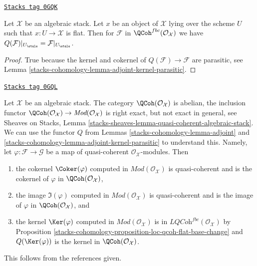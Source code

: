\begin{lemma}
\label{stacks-cohomology-lemma-flat-object-and-Q}
\href{https://stacks.math.columbia.edu/tag/0GQK}{\texttt{Stacks tag 0GQK}}

Let $\mathcal{X}$ be an algebraic stack. Let $x$ be an object of $\mathcal{X}$
lying over the scheme $U$ such that $x : U \to \mathcal{X}$ is flat.
Then for $\mathcal{F}$ in $\QCoh^{fbc}(\mathcal{O}_\mathcal{X})$
we have $Q(\mathcal{F})|_{U_\etale} = \mathcal{F}|_{U_\etale}$.
\end{lemma}

\begin{proof}
True because the kernel and cokernel of $Q(\mathcal{F}) \to \mathcal{F}$
are parasitic, see Lemma \ref{stacks-cohomology-lemma-adjoint-kernel-parasitic}.
\end{proof}

\begin{remark}
\label{stacks-cohomology-remark-QCoh-abelian}
\href{https://stacks.math.columbia.edu/tag/0GQL}{\texttt{Stacks tag 0GQL}}

Let $\mathcal{X}$ be an algebraic stack. The category
$\QCoh(\mathcal{O}_\mathcal{X})$ is abelian, the inclusion functor
$\QCoh(\mathcal{O}_\mathcal{X}) \to \textit{Mod}(\mathcal{O}_\mathcal{X})$
is right exact, but not exact in general, see Sheaves on Stacks, Lemma
\ref{stacks-sheaves-lemma-quasi-coherent-algebraic-stack}.
We can use the functor $Q$ from
Lemmas \ref{stacks-cohomology-lemma-adjoint} and \ref{stacks-cohomology-lemma-adjoint-kernel-parasitic}
to understand this. Namely, let $\varphi : \mathcal{F} \to \mathcal{G}$
be a map of quasi-coherent $\mathcal{O}_\mathcal{X}$-modules. Then
\begin{enumerate}
\item the cokernel $\Coker(\varphi)$ computed in
$\textit{Mod}(\mathcal{O}_\mathcal{X})$ is quasi-coherent and
is the cokernel of $\varphi$ in $\QCoh(\mathcal{O}_\mathcal{X})$,
\item the image $\Im(\varphi)$ computed in
$\textit{Mod}(\mathcal{O}_\mathcal{X})$ is quasi-coherent and
is the image of $\varphi$ in $\QCoh(\mathcal{O}_\mathcal{X})$, and
\item the kernel $\Ker(\varphi)$ computed in
$\textit{Mod}(\mathcal{O}_\mathcal{X})$
is in $\textit{LQCoh}^{fbc}(\mathcal{O}_\mathcal{X})$
by Proposition \ref{stacks-cohomology-proposition-loc-qcoh-flat-base-change} and
$Q(\Ker(\varphi))$ is the kernel in $\QCoh(\mathcal{O}_\mathcal{X})$.
\end{enumerate}
This follows from the references given.
\end{remark}

